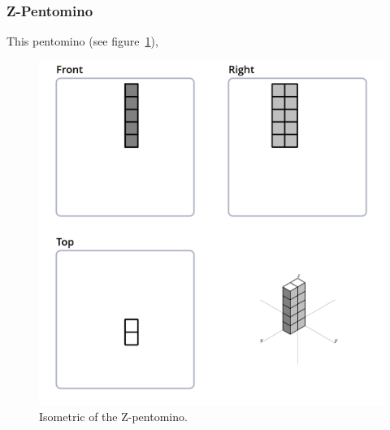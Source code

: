 \subsubsection{Z-Pentomino}
This pentomino (see figure~\ref{fig:iso-pent-z}),


\begin{figure}
	\centering
	\includegraphics[scale=0.3]{iso_diagrams/o.png}
	\caption{Isometric of the Z-pentomino.}
  \label{fig:iso-pent-z}
\end{figure}
